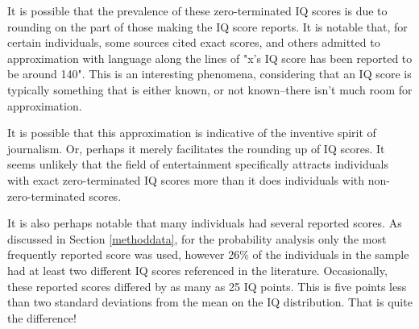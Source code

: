 \documentclass[12pt,letterpaper,titlepage,oneside]{article}
\begin{document}
It is possible that the prevalence of these zero-terminated IQ scores is due to rounding on the part of those making the IQ score reports. It is notable that, for certain individuals, some sources cited exact scores, and others admitted to approximation with language along the lines of "x's IQ score has been reported to be around 140". This is an interesting phenomena, considering that an IQ score is typically something that is either known, or not known--there isn't much room for approximation.

It is possible that this approximation is indicative of the inventive spirit of journalism. Or, perhaps it merely facilitates the rounding up of IQ scores. It seems unlikely that the field of entertainment specifically attracts individuals with exact zero-terminated IQ scores more than it does individuals with non-zero-terminated scores.

It is also perhaps notable that many individuals had several reported scores. As discussed in Section \ref{methoddata}, for the probability analysis only the most frequently reported score was used, however 26\% of the individuals in the sample had at least two different IQ scores referenced in the literature. Occasionally, these reported scores differed by as many as 25 IQ points. This is five points less than two standard deviations from the mean on the IQ distribution. That is quite the difference!
\end{document}
